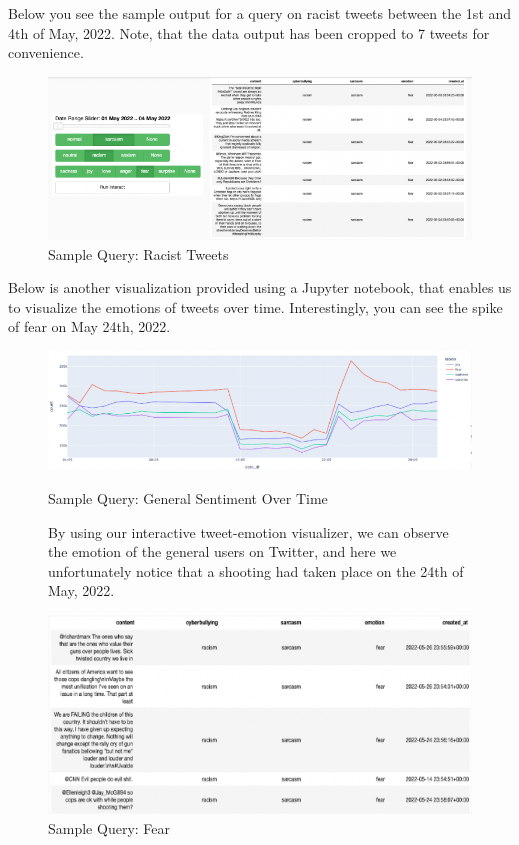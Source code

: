\documentclass[a4paper,12pt]{article}
\begin{document}
Below you see the sample output for a query on racist tweets between the 1st and 4th of May, 2022. Note, that the data output
has been cropped to 7 tweets for convenience.

\begin{figure}[h]
	\centering
	\includegraphics[width=\textwidth]{racism.png}
	\caption{Sample Query: Racist Tweets}
	\label{fig:Racist-Tweet-Query}
\end{figure}

Below is another visualization provided using a Jupyter notebook, that enables us to visualize the emotions of tweets over time.
Interestingly, you can see the spike of fear on May 24th, 2022.

\begin{figure}[h]
{\centering
	\includegraphics[width=\textwidth]{graph.png}
	\caption{Sample Query: General Sentiment Over Time}
	\label{fig:Emotion-Time-Query}
}
	\vspace{5mm} %
By using our interactive tweet-emotion visualizer, we can
observe the emotion of the general users on Twitter, and here we unfortunately notice that a shooting had taken place
on the 24th of May, 2022.
	{
	\centering
	\includegraphics[width=\textwidth]{graphTweets.png}
	\caption{Sample Query: Fear}
	\label{fig:Fear-Query}
}
\end{figure}
\end{document}
